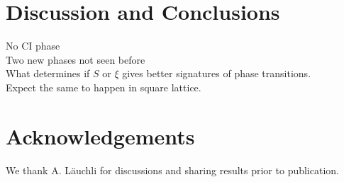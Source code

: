 \documentclass[aps,prx,10pt,twocolumn,floatfix,superscriptaddress,showpacs,numerical,footinbib]{revtex4-1}
\begin{document}
% 




%
\section{Discussion and Conclusions}
%



No CI phase\\
%
Two new phases not seen before\\
%
What determines if $S$ or $\xi$ gives better signatures of phase transitions. \\
%
Expect the same to happen in square lattice.

\section{Acknowledgements}

We thank A. Läuchli for discussions and sharing results prior to publication.


\end{document}
